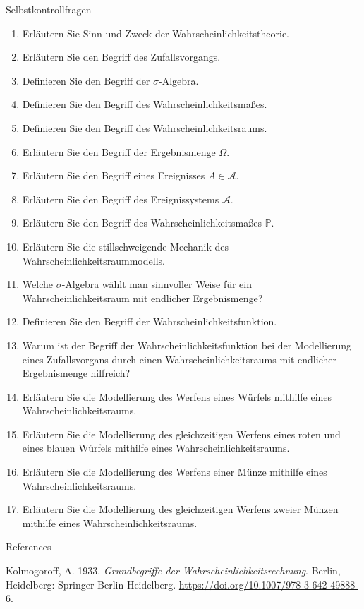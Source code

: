 \documentclass[
  8pt,
  ignorenonframetext,
]{beamer}
\newlength{\cslhangindent}
\newlength{\cslentryspacingunit} %
\newenvironment{CSLReferences}[2] %
 {%
  \setlength{\parindent}{0pt}
  \ifodd #1
  \let\oldpar\par
  \def\par{\hangindent=\cslhangindent\oldpar}
  \fi
  \setlength{\parskip}{#2\cslentryspacingunit}
 }%
 {}
\begin{document}
\begin{frame}{Selbstkontrollfragen}
\protect\hypertarget{selbstkontrollfragen}{}
\footnotesize
\begin{enumerate}
\itemsep0mm
\item Erläutern Sie Sinn und Zweck der Wahrscheinlichkeitstheorie.
\item Erläutern Sie den Begriff des Zufallsvorgangs.
\item Definieren Sie den Begriff der $\sigma$-Algebra.
\item Definieren Sie den Begriff des Wahrscheinlichkeitsmaßes.
\item Definieren Sie den Begriff des Wahrscheinlichkeitsraums.
\item Erläutern Sie den Begriff der Ergebnismenge $\Omega$.
\item Erläutern Sie den Begriff eines Ereignisses $A \in \mathcal{A}$.
\item Erläutern Sie den Begriff des Ereignissystems $\mathcal{A}$.
\item Erläutern Sie den Begriff des Wahrscheinlichkeitsmaßes $\mathbb{P}$.
\item Erläutern Sie die stillschweigende Mechanik des Wahrscheinlichkeitsraummodells.
\item Welche $\sigma$-Algebra wählt man sinnvoller Weise für ein Wahrscheinlichkeitsraum mit endlicher Ergebnismenge?
\item Definieren Sie den Begriff der Wahrscheinlichkeitsfunktion.
\item Warum ist der Begriff der Wahrscheinlichkeitsfunktion bei der Modellierung
eines Zufallsvorgans durch einen  Wahrscheinlichkeitsraums mit endlicher Ergebnismenge hilfreich?
\item Erläutern Sie die Modellierung des Werfens eines Würfels mithilfe eines Wahrscheinlichkeitsraums.
\item Erläutern Sie die Modellierung des gleichzeitigen Werfens eines roten und eines blauen Würfels mithilfe eines Wahrscheinlichkeitsraums.
\item Erläutern Sie die Modellierung des Werfens einer Münze mithilfe eines Wahrscheinlichkeitsraums.
\item Erläutern Sie die Modellierung des gleichzeitigen Werfens zweier Münzen mithilfe eines Wahrscheinlichkeitsraums.
\end{enumerate}
\end{frame}

\begin{frame}{References}
\protect\hypertarget{references}{}
\footnotesize

\hypertarget{refs}{}
\begin{CSLReferences}{1}{0}
\leavevmode{}%
Kolmogoroff, A. 1933. \emph{{Grundbegriffe der
Wahrscheinlichkeitsrechnung}}. {Berlin, Heidelberg}: {Springer Berlin
Heidelberg}. \url{https://doi.org/10.1007/978-3-642-49888-6}.

\end{CSLReferences}
\end{frame}
\end{document}
